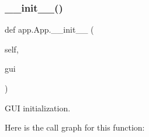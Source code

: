 \subsubsection{\texorpdfstring{\+\_\+\+\_\+init\+\_\+\+\_\+()}{\_\_init\_\_()}}
{\footnotesize\ttfamily def app.\+App.\+\_\+\+\_\+init\+\_\+\+\_\+ (\begin{DoxyParamCaption}\item[{}]{self,  }\item[{}]{gui }\end{DoxyParamCaption})}

\begin{DoxyVerb}GUI initialization.\end{DoxyVerb}
 Here is the call graph for this function\+:
